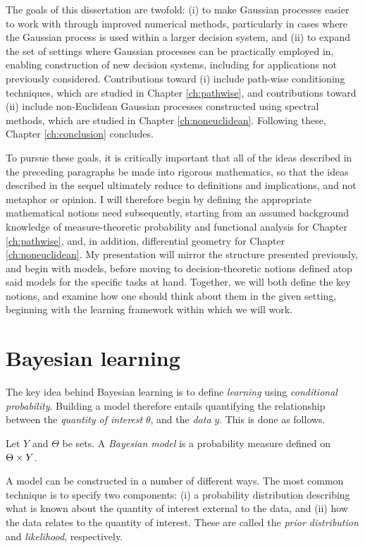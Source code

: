 \documentclass[11pt]{book}
\begin{document}
The goals of this dissertation are twofold: (i) to make Gaussian processes easier to work with through improved numerical methods, particularly in cases where the Gaussian process is used within a larger decision system, and (ii) to expand the set of settings where Gaussian processes can be practically employed in, enabling construction of new decision systems, including for applications not previously considered.
Contributions toward (i) include path-wise conditioning techniques, which are studied in Chapter \ref{ch:pathwise}, and contributions toward (ii) include non-Euclidean Gaussian processes constructed using spectral methods, which are studied in Chapter \ref{ch:noneuclidean}.
Following these, Chapter \ref{ch:conclusion} concludes.

To pursue these goals, it is critically important that all of the ideas described in the preceding paragraphs be made into rigorous mathematics, so that the ideas described in the sequel ultimately reduce to definitions and implications, and not metaphor or opinion.
I will therefore begin by defining the appropriate mathematical notions need subsequently, starting from an assumed background knowledge of measure-theoretic probability and functional analysis for Chapter \ref{ch:pathwise}, and, in addition, differential geometry for Chapter \ref{ch:noneuclidean}.
My presentation will mirror the structure presented previously, and begin with models, before moving to decision-theoretic notions defined atop said models for the specific tasks at hand.
Together, we will both define the key notions, and examine how one should think about them in the given setting, beginning with the learning framework within which we will work.

\section{Bayesian learning}

The key idea behind Bayesian learning is to define \emph{learning} using \emph{conditional probability}.
Building a model therefore entails quantifying the relationship between the \emph{quantity of interest} $\theta$, and the \emph{data} $y$.
This is done as follows.

\begin{definition}
Let $Y$ and $\Theta$ be sets.
A \emph{Bayesian model} is a probability measure defined on $\Theta \times Y$.
\end{definition}

A model can be constructed in a number of different ways.
The most common technique is to specify two components: (i) a probability distribution describing what is known about the quantity of interest external to the data, and (ii) how the data relates to the quantity of interest.
These are called the \emph{prior distribution} and \emph{likelihood}, respectively.
\end{document}

